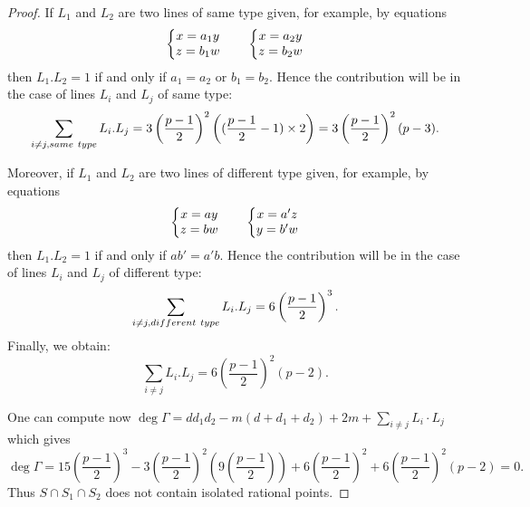 \documentclass[10pt,a4paper]{amsart}
\begin{document}
\begin{proof}
If $L_1$ and $L_2$ are two lines of same type given, for example, by equations
\begin{equation*}
\left\{
\begin{matrix}
x = a_1y   \\
z = b_1w \cr
\end{matrix}
\right.
\qquad
\left\{
\begin{matrix}
x = a_2y   \\
z = b_2w\cr
\end{matrix}
\right. 
\end{equation*}
then $L_1.L_2=1$ if and only if $a_1=a_2$ or $b_1=b_2$.
Hence the contribution will be in the case of lines $L_i$ and $L_j$ of same type:
$$\sum_{i\not=j, {\rm same\ type}}L_i.L_j=3\left(\frac{p-1}{2}\right)^2\left((\frac{p-1}{2}-1)\times 2\right)=3\left(\frac{p-1}{2}\right)^2(p-3).$$

Moreover, if $L_1$ and $L_2$ are two lines of different type given, for example, by equations
\begin{equation*}
\left\{
\begin{matrix}
x = ay   \\
z = bw \cr
\end{matrix}
\right.
\qquad
\left\{
\begin{matrix}
x = a'z   \\
y = b'w\cr
\end{matrix}
\right. 
\end{equation*}
then $L_1.L_2=1$ if and only if $ab'=a'b$.
Hence the contribution will be in the case of lines $L_i$ and $L_j$ of different type:
$$\sum_{i\not=j, {\rm different\  type}}L_i.L_j=6\left(\frac{p-1}{2}\right)^3.$$
Finally, we obtain:
$$\sum_{i\not=j}L_i.L_j=6\left(\frac{p-1}{2}\right)^2(p-2).$$

One can compute now 
$\deg\Gamma= dd_1d_2 - m(d+d_1+d_2)+2m+ \sum_{i \ne j} L_i\cdot L_j$ which gives
$$\deg\Gamma= 15\left(\frac{p-1}{2}\right)^3-3\left(\frac{p-1}{2}\right)^2\left(9\left(\frac{p-1}{2}\right)\right)+6\left(\frac{p-1}{2}\right)^2+6\left(\frac{p-1}{2}\right)^2(p-2)=0.$$
Thus $S\cap S_1\cap S_2$ does not contain isolated rational points.
\end{proof}
\end{document}
